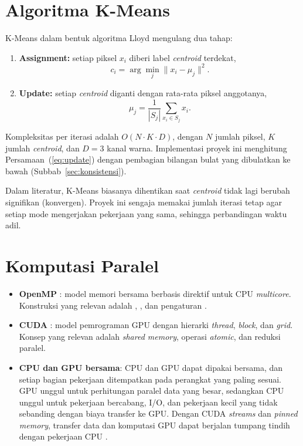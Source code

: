 \section{Algoritma K-Means}
\label{sec:kmeans}
K-Means dalam bentuk algoritma Lloyd \cite{lloyd1982} mengulang dua tahap:
\begin{enumerate}
    \item \textbf{Assignment:} setiap piksel $x_i$ diberi label \emph{centroid} terdekat,
    \begin{equation}
        c_i = \arg\min_{j} \lVert x_i - \mu_j \rVert^2 .
        \label{eq:assign}
    \end{equation}
    \item \textbf{Update:} setiap \emph{centroid} diganti dengan rata-rata piksel anggotanya,
    \begin{equation}
        \mu_j = \frac{1}{|S_j|}\sum_{x_i \in S_j} x_i .
        \label{eq:update}
    \end{equation}
\end{enumerate}
Kompleksitas per iterasi adalah $O(N \cdot K \cdot D)$, dengan $N$ jumlah piksel, $K$ jumlah \emph{centroid}, dan $D=3$ kanal warna. Implementasi proyek ini menghitung Persamaan~(\ref{eq:update}) dengan pembagian bilangan bulat yang dibulatkan ke bawah (Subbab~\ref{sec:konsistensi}).

Dalam literatur, K-Means biasanya dihentikan saat \emph{centroid} tidak lagi berubah signifikan (konvergen). Proyek ini sengaja memakai jumlah iterasi tetap agar setiap mode mengerjakan pekerjaan yang sama, sehingga perbandingan waktu adil.

\section{Komputasi Paralel}
\begin{itemize}
    \item \textbf{OpenMP} \cite{openmp52}: model memori bersama berbasis direktif untuk CPU \emph{multicore}. Konstruksi yang relevan adalah , , dan pengaturan .
    \item \textbf{CUDA} \cite{cudaguide}: model pemrograman GPU dengan hierarki \emph{thread}, \emph{block}, dan \emph{grid}. Konsep yang relevan adalah \emph{shared memory}, operasi \emph{atomic}, dan reduksi paralel.
    \item \textbf{CPU dan GPU bersama}: CPU dan GPU dapat dipakai bersama, dan setiap bagian pekerjaan ditempatkan pada perangkat yang paling sesuai. GPU unggul untuk perhitungan paralel data yang besar, sedangkan CPU unggul untuk pekerjaan bercabang, I/O, dan pekerjaan kecil yang tidak sebanding dengan biaya transfer ke GPU. Dengan CUDA \emph{streams} dan \emph{pinned memory}, transfer data dan komputasi GPU dapat berjalan tumpang tindih dengan pekerjaan CPU \cite{cudaguide}.
\end{itemize}

